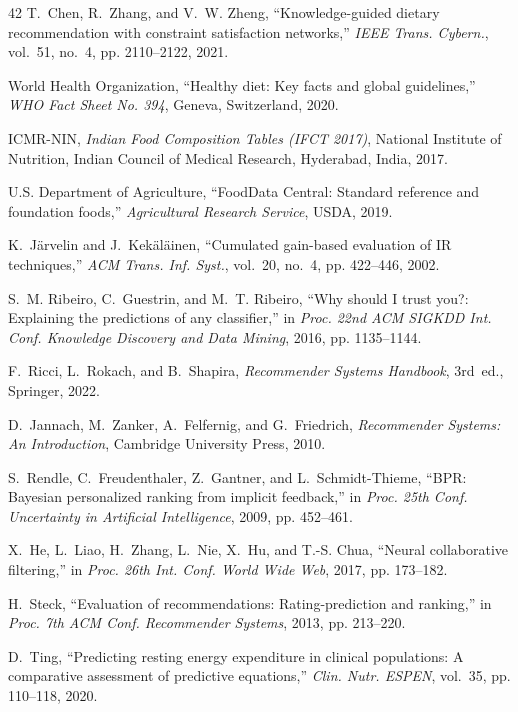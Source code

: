 \documentclass[12pt,a4paper]{report}
\begin{document}
\begin{thebibliography}{42}
T.~Chen, R.~Zhang, and V.~W. Zheng, ``Knowledge-guided dietary recommendation with constraint satisfaction networks,'' \emph{IEEE Trans. Cybern.}, vol.~51, no.~4, pp. 2110--2122, 2021.

World Health Organization, ``Healthy diet: Key facts and global guidelines,'' \emph{WHO Fact Sheet No. 394}, Geneva, Switzerland, 2020.

ICMR-NIN, \emph{Indian Food Composition Tables (IFCT 2017)}, National Institute of Nutrition, Indian Council of Medical Research, Hyderabad, India, 2017.

U.S. Department of Agriculture, ``FoodData Central: Standard reference and foundation foods,'' \emph{Agricultural Research Service}, USDA, 2019.

K.~J{\"a}rvelin and J.~Kek{\"a}l{\"a}inen, ``Cumulated gain-based evaluation of IR techniques,'' \emph{ACM Trans. Inf. Syst.}, vol.~20, no.~4, pp. 422--446, 2002.

S.~M. Ribeiro, C.~Guestrin, and M.~T. Ribeiro, ``Why should I trust you?: Explaining the predictions of any classifier,'' in \emph{Proc. 22nd ACM SIGKDD Int. Conf. Knowledge Discovery and Data Mining}, 2016, pp. 1135--1144.

F.~Ricci, L.~Rokach, and B.~Shapira, \emph{Recommender Systems Handbook}, 3rd~ed., Springer, 2022.

D.~Jannach, M.~Zanker, A.~Felfernig, and G.~Friedrich, \emph{Recommender Systems: An Introduction}, Cambridge University Press, 2010.

S.~Rendle, C.~Freudenthaler, Z.~Gantner, and L.~Schmidt-Thieme, ``BPR: Bayesian personalized ranking from implicit feedback,'' in \emph{Proc. 25th Conf. Uncertainty in Artificial Intelligence}, 2009, pp. 452--461.

X.~He, L.~Liao, H.~Zhang, L.~Nie, X.~Hu, and T.-S. Chua, ``Neural collaborative filtering,'' in \emph{Proc. 26th Int. Conf. World Wide Web}, 2017, pp. 173--182.

H.~Steck, ``Evaluation of recommendations: Rating-prediction and ranking,'' in \emph{Proc. 7th ACM Conf. Recommender Systems}, 2013, pp. 213--220.

D.~Ting, ``Predicting resting energy expenditure in clinical populations: A comparative assessment of predictive equations,'' \emph{Clin. Nutr. ESPEN}, vol.~35, pp. 110--118, 2020.


\end{thebibliography}
\end{document}
